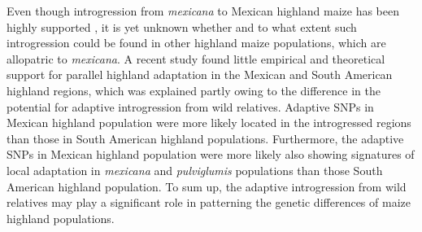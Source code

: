 \documentclass[11pt]{article}
\begin{document}
Even though introgression from \emph{mexicana} to Mexican highland maize has been highly supported \cite{hufford2013}, it is yet unknown whether and to what extent such introgression could be found in other highland maize populations, which are allopatric to \emph{mexicana}. 
A recent study \cite{Takuno2015} found little empirical and theoretical support for parallel highland adaptation in the Mexican and South American highland regions, which was explained partly owing to the difference in the potential for adaptive introgression from wild relatives.
Adaptive SNPs in Mexican highland population were more likely located in the introgressed regions than those in South American highland populations.
Furthermore, the adaptive SNPs in Mexican highland population were more likely also showing signatures of local adaptation in \emph{mexicana} and \emph {pulviglumis} populations than those South American highland population.
To sum up, the adaptive introgression from wild relatives may play a significant role in patterning the genetic differences of maize highland populations.
\end{document}

